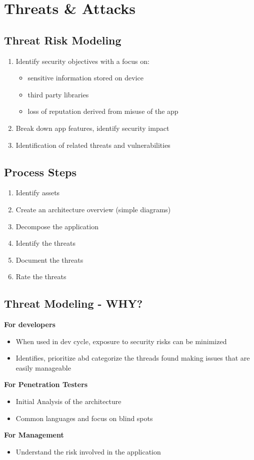 
\section{Threats \& Attacks}
\subsection{Threat Risk Modeling}
\begin{enumerate}
    \item Identify security objectives with a focus on:
    \begin{itemize}
        \item sensitive information stored on device
        \item third party libraries
        \item loss of reputation derived from misuse of the app
    \end{itemize}
    \item Break down app features, identify security impact
    \item Identification of related threats and vulnerabilities
\end{enumerate}

\subsection{Process Steps}
\begin{enumerate}
    \item Identify assets
    \item Create an architecture overview (simple diagrams)
    \item Decompose the application
    \item Identify the threats
    \item Document the threats
    \item Rate the threats
\end{enumerate}

\subsection{Threat Modeling - WHY?}
\textbf{For developers}
\begin{itemize}
    \item When used in dev cycle, exposure to security risks can be minimized
    \item Identifies, prioritize abd categorize the threads found making issues that are easily manageable
\end{itemize}
\textbf{For Penetration Testers}
\begin{itemize}
    \item Initial Analysis of the architecture
    \item Common languages and focus on blind spots
\end{itemize}
\textbf{For Management}
\begin{itemize}
    \item Understand the risk involved in the application
\end{itemize}

